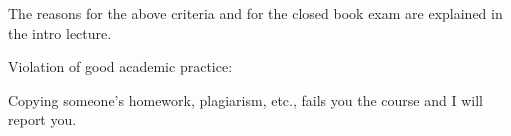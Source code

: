 \documentclass[usegeometry,parskip=half]{scrartcl}
\begin{document}
The reasons for the above criteria and for the closed book exam are explained in the intro lecture.

\vspace*{\parskip}

Violation of good academic practice:

Copying someone's homework, plagiarism, etc.\footnotemark{}, fails you the course and I will report you.

\end{document}
